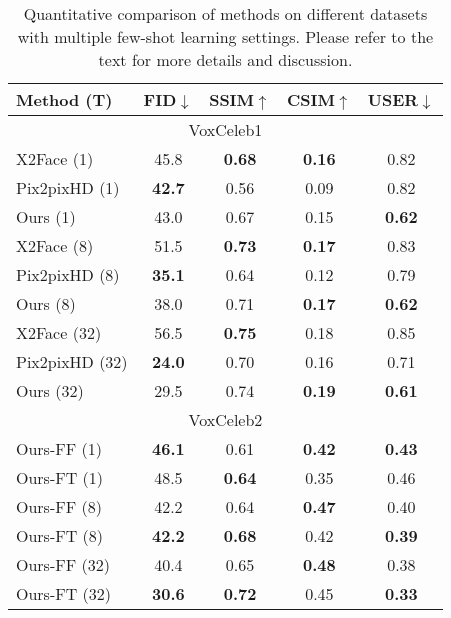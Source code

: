 \documentclass[10pt,twocolumn,letterpaper]{article}
\begin{document}
\begin{table}
    \begin{subtable}{\linewidth}
        \centering
        \begin{tabular}{ l c c c c}
            Method (T) & FID$\downarrow$ & SSIM$\uparrow$ & CSIM$\uparrow$ & USER$\downarrow$ \\
            \hline
            \multicolumn{5}{c}{VoxCeleb1}\\
            \hline
            X2Face (1)     & 45.8 & \textbf{0.68} & \textbf{0.16} & 0.82 \\
            Pix2pixHD (1)  & \textbf{42.7} & 0.56 & 0.09 & 0.82\\
            Ours  (1)      & 43.0 & 0.67 & 0.15 & \textbf{0.62}\\
            \hline
            X2Face (8)      & 51.5 & \textbf{0.73} & \textbf{0.17} & 0.83\\
            Pix2pixHD (8)   & \textbf{35.1} & 0.64 & 0.12 & 0.79\\
            Ours (8)        & 38.0 & 0.71 & \textbf{0.17} & \textbf{0.62}\\
            \hline
            X2Face (32)    & 56.5 & \textbf{0.75} & 0.18 & 0.85 \\
            Pix2pixHD (32) & \textbf{24.0} & 0.70 & 0.16 & 0.71 \\
            Ours (32)      & 29.5 & 0.74 & \textbf{0.19} & \textbf{0.61} \\
            \hline
            \multicolumn{5}{c}{VoxCeleb2} \\                                
            \hline
            Ours-FF (1)  & \textbf{46.1} & 0.61 & \textbf{0.42} & \textbf{0.43} \\
            Ours-FT (1)  & 48.5 & \textbf{0.64} & 0.35 & 0.46 \\
            \hline
            Ours-FF (8)  & 42.2 & 0.64 & \textbf{0.47} & 0.40 \\
            Ours-FT (8)  & \textbf{42.2} & \textbf{0.68} & 0.42 & \textbf{0.39} \\
            \hline
            Ours-FF (32) & 40.4 & 0.65 & \textbf{0.48} & 0.38 \\
            Ours-FT (32) & \textbf{30.6} & \textbf{0.72} & 0.45 & {\color{red}\textbf{0.33}} \\

        \end{tabular}
    \end{subtable}\vspace{-2pt}
    \caption{Quantitative comparison of methods on different datasets with multiple few-shot learning settings. Please refer to the text for more details and discussion.\vspace{-4pt}}\label{tab:maincomp}
\end{table}
\end{document}
